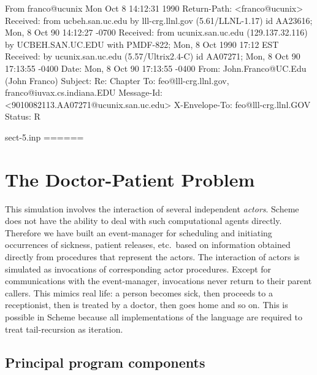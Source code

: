 From franco@ucunix Mon Oct  8 14:12:31 1990
Return-Path: <franco@ucunix>
Received: from ucbeh.san.uc.edu by lll-crg.llnl.gov (5.61/LLNL-1.17)
	id AA23616; Mon, 8 Oct 90 14:12:27 -0700
Received: from ucunix.san.uc.edu (129.137.32.116) by UCBEH.SAN.UC.EDU with
 PMDF-822; Mon, 8 Oct 1990 17:12 EST
Received: by ucunix.san.uc.edu (5.57/Ultrix2.4-C) id AA07271; Mon, 8 Oct 90
 17:13:55 -0400
Date: Mon, 8 Oct 90 17:13:55 -0400
From: John.Franco@UC.Edu (John Franco)
Subject: Re:  Chapter
To: feo@lll-crg.llnl.gov, franco@iuvax.cs.indiana.EDU
Message-Id: <9010082113.AA07271@ucunix.san.uc.edu>
X-Envelope-To: feo@lll-crg.llnl.GOV
Status: R

sect-5.inp
======
\section{The Doctor-Patient Problem}

This simulation involves the interaction of several independent {\it actors}.
Scheme does not have the ability to deal with such computational agents directly.
Therefore we have built an event-manager for scheduling and initiating
occurrences of sickness, patient releases, etc.\ based on information obtained
directly from procedures that represent the actors.  The
interaction of actors is simulated as invocations of corresponding actor
procedures.  Except for communications with the event-manager, invocations
never return to their parent callers.  This mimics real life: a person
becomes sick, then proceeds to a receptionist, then is treated by a doctor,
then goes home and so on.  This is possible in Scheme because all
implementations of the language are required to treat tail-recursion as
iteration.

\subsection{Principal program components}

